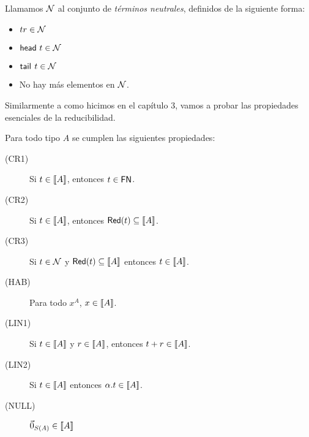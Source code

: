 \begin{definition}
  Llamamos \( \mathcal{N} \) al conjunto de \textit{términos neutrales},
  definidos de la siguiente forma:
  \begin{itemize}
    \item \( t r \in \mathcal{N} \)
    \item \( \mathsf{head}~t \in \mathcal{N} \)
    \item \( \mathsf{tail}^{}~t \in \mathcal{N} \)
    \item No hay más elementos en \( \mathcal{N} \).
  \end{itemize}
\end{definition}

Similarmente a como hicimos en el capítulo 3, vamos a probar las propiedades esenciales de la reducibilidad.

\begin{lemma}\label{lem:cr}
  Para todo tipo \( A \) se cumplen las siguientes propiedades:
  \begin{description}
    \item[(CR1)] Si \( t \in \llbracket A\rrbracket \), entonces \( t \in \mathsf{FN} \).
    \item[(CR2)] Si \( t \in \llbracket A\rrbracket \), entonces \( \mathsf{Red} (t) \subseteq \llbracket A\rrbracket \).
    \item[(CR3)] Si \( t \in \mathcal{N} \) y \( \mathsf{Red} (t) \subseteq \llbracket A\rrbracket \) entonces \( t \in \llbracket A\rrbracket \).
    \item[(HAB)] Para todo \( x^A \), \( x \in \llbracket A\rrbracket \).
    \item[(LIN1)] Si \( t \in \llbracket A\rrbracket \) y \( r \in \llbracket A\rrbracket \), entonces \( t + r \in \llbracket A\rrbracket \).
    \item[(LIN2)] Si \( t \in \llbracket A\rrbracket \) entonces \( \alpha . t \in \llbracket A\rrbracket \).
    \item[(NULL)] \( \vec{0}_{S (A)} \in \llbracket A\rrbracket \)
  \end{description}
\end{lemma}

